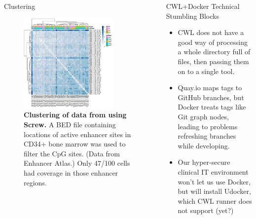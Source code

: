 \documentclass{beamer}
\begin{document}
\begin{frame}
\begin{columns}[t]
\begin{column}{.65\textwidth}
\begin{columns}[t,totalwidth=\textwidth]
\begin{column}{.48\textwidth}
\begin{block}{Clustering}
\begin{figure}
\begin{center}
\includegraphics[width=0.8\textwidth]{figures/farlik_heatmap.pdf}
\caption{\textbf{Clustering of data from \cite{Farlik2016} using Screw.} A BED file containing locations of active enhancer sites in CD34+ bone marrow was used to filter the CpG sites. (Data from Enhancer Atlas.) Only 47/100 cells had coverage in those enhancer regions.  }
\end{center}
\end{figure}


\end{block}


\end{column}

	\begin{column}{.48\textwidth}

\begin{block}{CWL+Docker Technical Stumbling Blocks}
\begin{itemize}
\item CWL does not have a good way of processing a whole directory full of files, then passing them on to a single tool.
\item Quay.io maps tags to GitHub branches, but Docker treats tags like Git graph nodes, leading to problems refreshing branches while developing.
\item Our hyper-secure clinical IT environment won't let us use Docker, but will install Udocker, which CWL runner does not support (yet?)
\end{itemize}
\end{block}




\end{column}
\end{columns}
\end{column}
\end{columns}
\end{frame}
\end{document}
